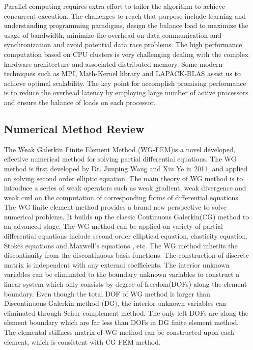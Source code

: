 Parallel computing requires extra effort to tailor the algorithm to achieve concurrent execution. The challenges to reach that purpose include learning and understanding programming paradigms, design the balance load to maximize the usage of bandwidth, minimize the overhead on data communication and synchronization and avoid potential data race problems. The high performance computation based on CPU clusters is very challenging dealing with the complex hardware architecture and associated distributed memory. Some modern techniques such as MPI, Math-Kernel library and LAPACK-BLAS assist us to achieve optimal scalability. The key point for accomplish promising performance is to reduce the overhead latency by employing large number of active processors and ensure the balance of loads on each processor.

\subsection{Numerical Method Review}

The Weak Galerkin Finite Element Method (WG-FEM)is a novel developed, effective numerical method for solving partial differential equations. The WG method is first developed by Dr. Junping Wang and Xiu Ye in 2011, and applied on solving second order elliptic equation\cite{wang2014weak}. The main theory of WG method is to introduce a series of weak operators such as weak gradient, weak divergence and weak curl on the computation of corresponding forms of differential equations. The WG finite element method provides a  brand new perspective to solve numerical problems. It builds up the classic Continuous Galerkin(CG) method to an advanced stage. The WG method can be applied on variety of partial differential equations include second order elliptical equation, elasticity equation\cite{wang2016locking}, Stokes equations \cite{wang2016weak} and Maxwell's equations \cite{mu2013weak}, etc. The WG method inherits the discontinuity from the discontinuous basis functions. The construction of discrete matrix is independent with any external coefficients. The interior unknown variables can be eliminated to the boundary unknown variables to construct a linear system which only consists by degree of freedom(DOFs) along the element boundary. Even though the total DOF of WG method is larger than Discontinuous Galerkin method (DG), the interior unknown variables can eliminated through Schur complement method. The only left DOFs are along the element boundary which are far less than DOFs in DG finite element method. The elemental stiffness matrix of WG method can be constructed upon each element, which is consistent with CG FEM method. 


